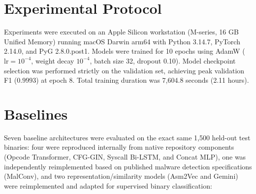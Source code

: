 \documentclass[pdflatex,sn-mathphys-num]{sn-jnl}
\begin{document}
\section{Experimental Protocol}\label{sec:protocol}
Experiments were executed on an Apple Silicon workstation (M-series, 16 GB Unified Memory) running macOS Darwin arm64 with Python 3.14.7, PyTorch 2.14.0, and PyG 2.8.0.post1. Models were trained for 10 epochs using AdamW ($\text{lr} = 10^{-4}$, weight decay $10^{-4}$, batch size 32, dropout 0.10). Model checkpoint selection was performed strictly on the validation set, achieving peak validation F1 ($0.9993$) at epoch 8. Total training duration was 7,604.8 seconds (2.11 hours).

\section{Baselines}\label{sec:baselines}
Seven baseline architectures were evaluated on the exact same 1,500 held-out test binaries: four were reproduced internally from native repository components (Opcode Transformer, CFG-GIN, Syscall Bi-LSTM, and Concat MLP), one was independently reimplemented based on published malware detection specifications (MalConv), and two representation/similarity models (Asm2Vec and Gemini) were reimplemented and adapted for supervised binary classification:
\end{document}
